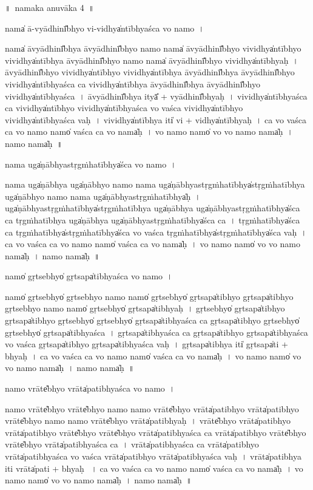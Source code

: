 \documentclass[parskip, DIV=14]{scrartcl}
\begin{document}
{%
\newpage
\LARGE
॥~namaka anuvāka 4~॥ 
\Large

nama̍ ā-vyā॒dhinī̎bhyo vi॒-vidhya̍ntībhyaśca vo॒ namo॒~।

nama̍ āvyā॒dhinī̎bhya āvyā॒dhinī̎bhyo॒ namo॒ nama̍ āvyā॒dhinī̎bhyo vi॒vidhya̍ntībhyo vi॒vidhya̍ntībhya āvyā॒dhinī̎bhyo॒ namo॒ nama̍ āvyā॒dhinī̎bhyo vi॒vidhya̍ntībhyaḥ~।
ā॒vyā॒dhinī̎bhyo vi॒vidhya̍ntībhyo vi॒vidhya̍ntībhya āvyā॒dhinī̎bhya āvyā॒dhinī̎bhyo vi॒vidhya̍ntībhyaśca ca vi॒vidhya̍ntībhya āvyā॒dhinī̎bhya āvyā॒dhinī̎bhyo vi॒vidhya̍ntībhyaśca~।
ā॒vyā॒dhinī̎bhya॒ ityā̎ + vyā॒dhinī̎bhyaḥ~।
vi॒vidhya̍ntībhyaśca ca vi॒vidhya̍ntībhyo vi॒vidhya̍ntībhyaśca vo vaśca vi॒vidhya̍ntībhyo vi॒vidhya̍ntībhyaśca vaḥ~।
vi॒vidhya̍ntībhya॒ iti̍ vi + vidhya̍ntībhyaḥ~।
ca॒ vo॒ va॒śca॒ ca॒ vo॒ namo॒ namo̍ vaśca ca vo॒ nama̍ḥ~।
vo॒ namo॒ namo̍ vo vo॒ namo॒ nama̍ḥ~।
namo॒ nama̍ḥ~॥ 

nama॒ uga̍ṇābhyastṛgṁha॒tībhya̍śca vo॒ namo॒~।

nama॒ uga̍ṇābhya॒  uga̍ṇābhyo॒ namo॒ nama॒ uga̍ṇābhyastṛgṁha॒tībhya̍stṛgṁha॒tībhya॒ uga̍ṇābhyo॒ namo॒ nama॒ uga̍ṇābhyastṛgṁha॒tībhya̍ḥ~।
uga̍ṇābhyastṛgṁha॒tībhya̍stṛgṁha॒tībhya॒ uga̍ṇābhya॒ uga̍ṇābhyastṛgṁha॒tībhya̍śca ca tṛgṁha॒tībhya॒ uga̍ṇābhya॒ uga̍ṇābhyastṛgṁha॒tībhya̍śca ca~।
tṛ॒gṁ॒ha॒tībhya̍śca ca tṛgṁha॒tībhya̍stṛgṁha॒tībhya̍śca vo vaśca tṛgṁha॒tībhya̍stṛgṁha॒tībhya̍śca vaḥ~।
ca॒ vo॒ va॒śca॒ ca॒ vo॒ namo॒ namo̍ vaśca ca vo॒ nama̍ḥ~।
vo॒ namo॒ namo̍ vo vo॒ namo॒ nama̍ḥ~।
namo॒ nama̍ḥ~॥ 

namo̍ gṛ॒tsebhyo̍ gṛ॒tsapa̍tibhyaśca vo॒ namo॒~।

namo̍  gṛ॒tsebhyo̍ gṛ॒tsebhyo॒ namo॒  namo̍ gṛ॒tsebhyo̍ gṛ॒tsapa̍tibhyo gṛ॒tsapa̍tibhyo gṛ॒tsebhyo॒ namo॒  namo̍ gṛ॒tsebhyo̍ gṛ॒tsapa̍tibhyaḥ~।
gṛ॒tsebhyo̍ gṛ॒tsapa̍tibhyo gṛ॒tsapa̍tibhyo gṛ॒tsebhyo̍ gṛ॒tsebhyo̍ gṛ॒tsapa̍tibhyaśca ca gṛ॒tsapa̍tibhyo gṛ॒tsebhyo̍ gṛ॒tsebhyo̍ gṛ॒tsapa̍tibhyaśca~।
gṛ॒tsapa̍tibhyaśca ca gṛ॒tsapa̍tibhyo gṛ॒tsapa̍tibhyaśca vo vaśca gṛ॒tsapa̍tibhyo gṛ॒tsapa̍tibhyaśca vaḥ~।
gṛ॒tsapa̍tibhya॒ iti̍ gṛ॒tsapa̍ti + bhya॒ḥ~।
ca॒ vo॒ va॒śca॒ ca॒ vo॒ namo॒ namo̍ vaśca ca vo॒ nama̍ḥ~।
vo॒ namo॒ namo̍ vo vo॒ namo॒ nama̍ḥ~।
namo॒ nama̍ḥ~॥ 

namo॒ vrāte̎bhyo॒ vrāta̍patibhyaśca vo॒ namo॒~।

namo॒ vrāte̎bhyo॒ vrāte̎bhyo॒ namo॒ namo॒ vrāte̎bhyo॒ vrāta̍patibhyo॒ vrāta̍patibhyo॒ vrāte̎bhyo॒ namo॒ namo॒ vrāte̎bhyo॒ vrāta̍patibhyaḥ~।
vrāte̎bhyo॒ vrāta̍patibhyo॒ vrāta̍patibhyo॒ vrāte̎bhyo॒ vrāte̎bhyo॒ vrāta̍patibhyaśca ca॒ vrāta̍patibhyo॒ vrāte̎bhyo॒ vrāte̎bhyo॒ vrāta̍patibhyaśca ca~।
vrāta̍patibhyaśca ca॒ vrāta̍patibhyo॒ vrāta̍patibhyaśca vo vaśca॒ vrāta̍patibhyo॒ vrāta̍patibhyaśca vaḥ~।
vrāta̍patibhya॒ iti॒ vrāta̍pati + bhya॒ḥ ~।
ca॒ vo॒ va॒śca॒ ca॒ vo॒ namo॒ namo̍ vaśca ca vo॒ nama̍ḥ~।
vo॒ namo॒ namo̍ vo vo॒ namo॒ nama̍ḥ~।
namo॒ nama̍ḥ~॥ 

}
\end{document}
